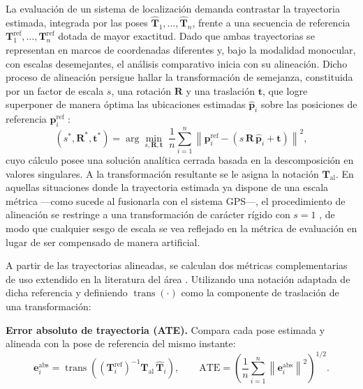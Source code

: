 La evaluación de un sistema de localización demanda contrastar la trayectoria estimada, integrada por las poses $\hat{\mathbf{T}}_1,\ldots,\hat{\mathbf{T}}_n$, frente a una secuencia de referencia $\mathbf{T}^{\mathrm{ref}}_1,\ldots,\mathbf{T}^{\mathrm{ref}}_n$ dotada de mayor exactitud.
Dado que ambas trayectorias se representan en marcos de coordenadas diferentes y, bajo la modalidad monocular, con escalas desemejantes, el análisis comparativo inicia con su alineación.
Dicho proceso de alineación persigue hallar la transformación de semejanza, constituida por un factor de escala $s$, una rotación $\mathbf{R}$ y una traslación $\mathbf{t}$, que logre superponer de manera óptima las ubicaciones estimadas $\hat{\mathbf{p}}_i$ sobre las posiciones de referencia $\mathbf{p}^{\mathrm{ref}}_i$ \cite{umeyama1991alignment}:
\begin{equation}
(s^{*},\mathbf{R}^{*},\mathbf{t}^{*}) = \arg\min_{s,\mathbf{R},\mathbf{t}} \; \frac{1}{n}\sum_{i=1}^{n} \left\| \mathbf{p}^{\mathrm{ref}}_i - \left(s\,\mathbf{R}\,\hat{\mathbf{p}}_i + \mathbf{t}\right) \right\|^{2},
\label{eq:alineacion}
\end{equation}
cuyo cálculo posee una solución analítica cerrada basada en la descomposición en valores singulares.
A la transformación resultante se le asigna la notación $\mathbf{T}_{\mathrm{al}}$.
En aquellas situaciones donde la trayectoria estimada ya dispone de una escala métrica —como sucede al fusionarla con el sistema GPS—, el procedimiento de alineación se restringe a una transformación de carácter rígido con $s=1$ \cite{sturm2012benchmark}, de modo que cualquier sesgo de escala se vea reflejado en la métrica de evaluación en lugar de ser compensado de manera artificial.

A partir de las trayectorias alineadas, se calculan dos métricas complementarias de uso extendido en la literatura del área \cite{sturm2012benchmark}.
Utilizando una notación adaptada de dicha referencia y definiendo $\operatorname{trans}(\cdot)$ como la componente de traslación de una transformación:

\textbf{Error absoluto de trayectoria (ATE).}
Compara cada pose estimada y alineada con la pose de referencia del mismo instante:
\begin{equation}
\mathbf{e}^{\mathrm{abs}}_i = \operatorname{trans}\!\left( \left(\mathbf{T}^{\mathrm{ref}}_i\right)^{-1} \mathbf{T}_{\mathrm{al}}\, \hat{\mathbf{T}}_i \right),
\qquad
\mathrm{ATE} = \left( \frac{1}{n}\sum_{i=1}^{n} \left\| \mathbf{e}^{\mathrm{abs}}_i \right\|^{2} \right)^{1/2}.
\label{eq:ate}
\end{equation}

